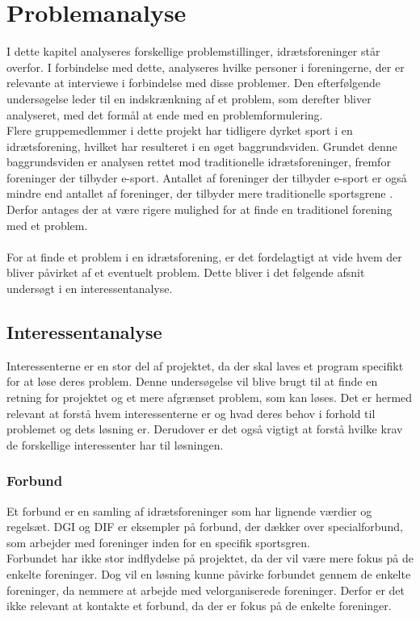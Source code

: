 \chapter{Problemanalyse}\label{ch:ch2label}
I dette kapitel analyseres forskellige problemstillinger, idrætsforeninger står overfor. I forbindelse med dette, analyseres hvilke personer i foreningerne, der er relevante at interviewe i forbindelse med disse problemer. Den efterfølgende undersøgelse leder til en indskrænkning af et problem, som derefter bliver analyseret, med det formål at ende med en problemformulering. \\
Flere gruppemedlemmer i dette projekt har tidligere dyrket sport i en idrætsforening, hvilket har resulteret i en øget baggrundsviden. Grundet denne baggrundsviden er analysen rettet mod traditionelle idrætsforeninger, fremfor foreninger der tilbyder e-sport. Antallet af foreninger der tilbyder e-sport er også mindre end antallet af foreninger, der tilbyder mere traditionelle sportsgrene \citep{e-sport}. Derfor antages der at være rigere mulighed for at finde en traditionel forening med et problem.
\\\\
For at finde et problem i en idrætsforening, er det fordelagtigt at vide hvem der bliver påvirket af et eventuelt problem. Dette bliver i det følgende afsnit undersøgt i en interessentanalyse. 
\newpage
\section{Interessentanalyse}
Interessenterne er en stor del af projektet, da der skal laves et program specifikt for at løse deres problem. Denne undersøgelse vil blive brugt til at finde en retning for projektet og et mere afgrænset problem, som kan løses. Det er hermed relevant at forstå hvem interessenterne er og hvad deres behov i forhold til problemet og dets løsning er. Derudover er det også vigtigt at forstå hvilke krav de forskellige interessenter har til løsningen.

\subsection*{Forbund}
Et forbund er en samling af idrætsforeninger som har lignende værdier og regelsæt. DGI og DIF er eksempler på forbund, der dækker over specialforbund, som arbejder med foreninger inden for en specifik sportsgren.\\
Forbundet har ikke stor indflydelse på projektet, da der vil være mere fokus på de enkelte foreninger. Dog vil en løsning kunne påvirke forbundet gennem de enkelte foreninger, da nemmere at arbejde med velorganiserede foreninger. Derfor er det ikke relevant at kontakte et forbund, da der er fokus på de enkelte foreninger. 

